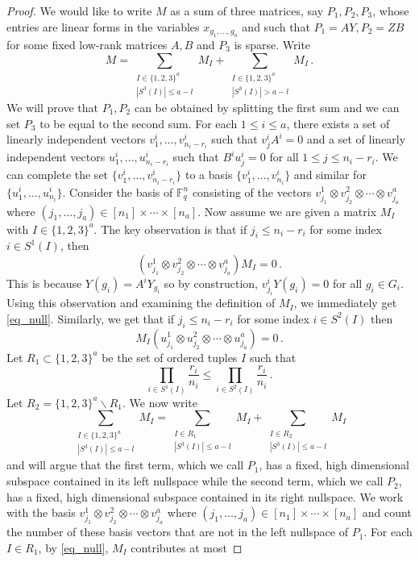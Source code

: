 \documentclass{toc}
\newcommand\F{{\mathbb{F}}}
\begin{document}
\begin{proof}
We would like to write $M $ as a sum of three matrices, say $P_1, P_2, P_3$, whose entries are linear forms in the variables $x_{g_1, \dots , g_a}$ and such that $P_1 = AY, P_2 = ZB$ for some fixed low-rank matrices $A,B$ and $P_3$ is sparse.  Write
\[
M = \sum_{\substack{I \in \{1,2,3 \}^a \\ |S^3(I)| \leq  a - l}}M_{I}  + \sum_{\substack{I \in \{1,2,3 \}^a \\ |S^3(I)| > a - l}}M_{I} \,.
\]
We will prove that $P_1,P_2$ can be obtained by splitting the first sum and we can set $P_3$ to be equal to the second sum.  For each $1 \leq i \leq a$, there exists a set of linearly independent vectors $v_1^i, \dots , v_{n_i - r_i}^i$ such that $v_{j}^iA^i = 0$ and a set of linearly independent vectors $u_1^i, \dots , u_{n_i - r_i}^i$ such that $B^iu_j^i = 0$ for all $1 \leq j \leq n_i - r_i$.  We can complete the set  $\{ v_1^i, \dots , v_{n_i - r_i}^i \}$ to a basis $\{ v_1^i, \dots , v_{n_i }^i \}$ and similar for $\{u_1^i, \dots , u_{n_i}^i \}$.  Consider the basis of $\F_q^{n}$ consisting of the vectors $v^1_{j_1} \otimes v^2_{j_2} \otimes \cdots \otimes v^a_{j_a}$ where $(j_1, \dots, j_a) \in [n_1] \times \cdots \times [n_a]$.  Now 
%
assume %
we are given a matrix $M_{I}$ with $I \in \{1,2,3 \}^a$.    The key observation is that if %
$j_{i} \leq n_{i} - r_{i}$ for some index $i \in S^1(I)$, %
%
then 
\begin{equation}\label{eq_null}
\left(v^1_{j_1} \otimes v^2_{j_2} \otimes \cdots \otimes v^a_{j_a}\right)M_I = 0\,.
\end{equation}
This is because $Y(g_i) = A^iY_{g_i}$ so by construction, $v^i_{j_i} Y(g_i) = 0$ for all $g_i \in G_i$.  Using this observation and examining the definition of $M_I$, we immediately get \eqref{eq_null}.  Similarly, we get that if $j_{i} \leq n_{i} - r_{i}$ for some index $i \in S^2(I)$ then 
\[
M_I\left(u^1_{j_1} \otimes u^2_{j_2} \otimes \cdots \otimes u^a_{j_a}\right) = 0 \,.
\]
Let $R_1 \subset \{1,2,3 \}^a$ be the set of ordered tuples $I$ such that 
\[
\prod_{i \in S^1(I)} \frac{r_i}{n_i} \leq \prod_{i \in S^2(I)} \frac{r_i}{n_i} \,.
\]
Let $R_2 = \{1,2,3 \}^a \backslash R_1$.  We now write
\[
\sum_{\substack{I \in \{1,2,3 \}^a \\ |S^3(I)| \leq  a - l}}M_{I} = \sum_{\substack{I \in R_1 \\ |S^3(I)| \leq  a - l}}M_{I} + \sum_{\substack{I \in R_2 \\ |S^3(I)| \leq  a - l}}M_{I}
\]
and will argue that the first term, which we call $P_1$, has a fixed, high dimensional subspace contained in its left nullspace while the second term, which we call $P_2$, has a fixed, high dimensional subspace contained in its right nullspace.  We work with the basis $v^1_{j_1} \otimes v^2_{j_2} \otimes \cdots \otimes v^a_{j_a}$ where $(j_1, \dots, j_a) \in [n_1] \times \cdots \times [n_a]$ and count the number of these basis vectors that are not in the left nullspace of $P_1$.  For each $I \in R_1$, by \eqref{eq_null}, $M_I$ contributes at most 

\end{proof}
\end{document}
